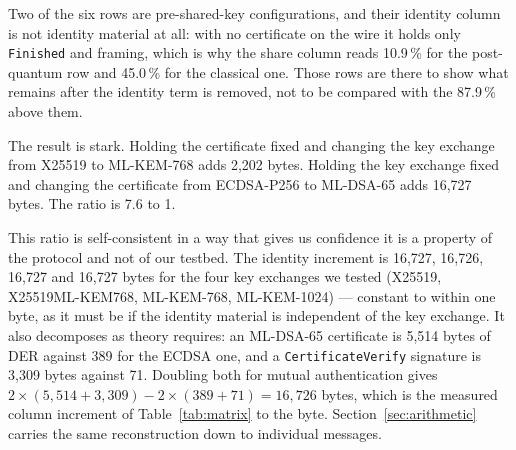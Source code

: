 \documentclass[drones,article,submit,pdftex,moreauthors]{Definitions/mdpi}
\newcommand{\mlkem}{ML-KEM}
\newcommand{\mldsa}{ML-DSA}
\begin{document}
Two of the six rows are pre-shared-key configurations, and their
identity column is not identity material at all: with no certificate on
the wire it holds only \texttt{Finished} and framing, which is why the
share column reads 10.9\,\% for the post-quantum row and 45.0\,\% for
the classical one. Those rows are there to show what remains after the
identity term is removed, not to be compared with the 87.9\,\% above
them.

The result is stark. Holding the certificate fixed and changing the key
exchange from X25519 to \mlkem{}-768 adds 2{,}202 bytes. Holding the
key exchange fixed and changing the certificate from ECDSA-P256 to
\mldsa{}-65 adds 16{,}727 bytes. The ratio is 7.6 to 1.

This ratio is self-consistent in a way that gives us confidence it is a
property of the protocol and not of our testbed. The identity increment
is 16{,}727, 16{,}726, 16{,}727 and 16{,}727 bytes for the four key
exchanges we tested (X25519, X25519\mlkem{}768, \mlkem{}-768,
\mlkem{}-1024) --- constant to within one byte, as it must be if the
identity material is independent of the key exchange. It also decomposes
as theory requires: an \mldsa{}-65 certificate is 5{,}514 bytes of DER
against 389 for the ECDSA one, and a \texttt{CertificateVerify}
signature is 3{,}309 bytes against 71. Doubling both for mutual
authentication gives $2\times(5{,}514+3{,}309) - 2\times(389+71) =
16{,}726$ bytes, which is the measured column increment of
Table~\ref{tab:matrix} to the byte.
Section~\ref{sec:arithmetic} carries the same reconstruction down to
individual messages.
\end{document}
